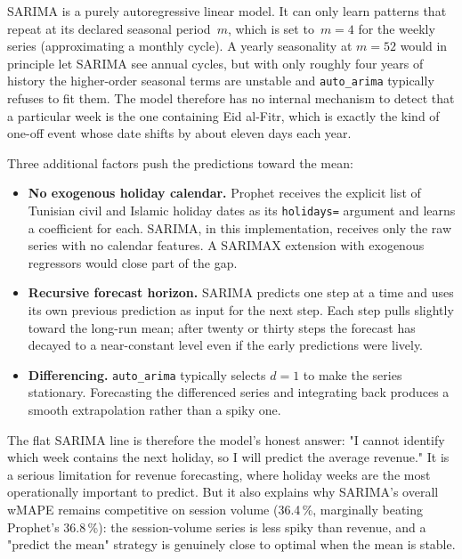 SARIMA is a purely autoregressive linear model. It can only learn patterns that repeat
at its declared seasonal period~$m$, which is set to~$m=4$ for the weekly series
(approximating a monthly cycle). A yearly seasonality at $m=52$ would in principle let
SARIMA see annual cycles, but with only roughly four years of history the higher-order
seasonal terms are unstable and \texttt{auto\_arima} typically refuses to fit them.
The model therefore has no internal mechanism to detect that a particular week is the
one containing Eid al-Fitr, which is exactly the kind of one-off event whose date
shifts by about eleven days each year.

Three additional factors push the predictions toward the mean:

\begin{itemize}
  \item \textbf{No exogenous holiday calendar.} Prophet receives the explicit list of
        Tunisian civil and Islamic holiday dates as its \texttt{holidays=} argument and
        learns a coefficient for each. SARIMA, in this implementation, receives only
        the raw series with no calendar features. A SARIMAX extension with exogenous
        regressors would close part of the gap.
  \item \textbf{Recursive forecast horizon.} SARIMA predicts one step at a time and uses
        its own previous prediction as input for the next step. Each step pulls slightly
        toward the long-run mean; after twenty or thirty steps the forecast has decayed
        to a near-constant level even if the early predictions were lively.
  \item \textbf{Differencing.} \texttt{auto\_arima} typically selects $d=1$ to make the
        series stationary. Forecasting the differenced series and integrating back
        produces a smooth extrapolation rather than a spiky one.
\end{itemize}

The flat SARIMA line is therefore the model's honest answer: "I cannot identify which
week contains the next holiday, so I will predict the average revenue." It is a
serious limitation for revenue forecasting, where holiday weeks are the most
operationally important to predict. But it also explains why SARIMA's overall wMAPE
remains competitive on session volume (36.4\,\%, marginally beating Prophet's
36.8\,\%): the session-volume series is less spiky than revenue, and a "predict the
mean" strategy is genuinely close to optimal when the mean is stable.


